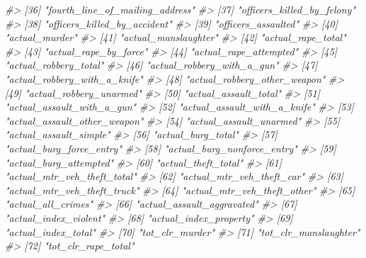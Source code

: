 \documentclass[
  12pt,
  openany]{book}
\newenvironment{Shaded}{\begin{snugshade}}{\end{snugshade}}
\newcommand{\CommentTok}[1]{\textcolor[rgb]{0.37,0.37,0.37}{\textit{#1}}}
\begin{document}
\begin{Shaded}
\begin{Highlighting}[]
\CommentTok{\#\textgreater{}  [36] "fourth\_line\_of\_mailing\_address"}
\CommentTok{\#\textgreater{}  [37] "officers\_killed\_by\_felony"     }
\CommentTok{\#\textgreater{}  [38] "officers\_killed\_by\_accident"   }
\CommentTok{\#\textgreater{}  [39] "officers\_assaulted"            }
\CommentTok{\#\textgreater{}  [40] "actual\_murder"                 }
\CommentTok{\#\textgreater{}  [41] "actual\_manslaughter"           }
\CommentTok{\#\textgreater{}  [42] "actual\_rape\_total"             }
\CommentTok{\#\textgreater{}  [43] "actual\_rape\_by\_force"          }
\CommentTok{\#\textgreater{}  [44] "actual\_rape\_attempted"         }
\CommentTok{\#\textgreater{}  [45] "actual\_robbery\_total"          }
\CommentTok{\#\textgreater{}  [46] "actual\_robbery\_with\_a\_gun"     }
\CommentTok{\#\textgreater{}  [47] "actual\_robbery\_with\_a\_knife"   }
\CommentTok{\#\textgreater{}  [48] "actual\_robbery\_other\_weapon"   }
\CommentTok{\#\textgreater{}  [49] "actual\_robbery\_unarmed"        }
\CommentTok{\#\textgreater{}  [50] "actual\_assault\_total"          }
\CommentTok{\#\textgreater{}  [51] "actual\_assault\_with\_a\_gun"     }
\CommentTok{\#\textgreater{}  [52] "actual\_assault\_with\_a\_knife"   }
\CommentTok{\#\textgreater{}  [53] "actual\_assault\_other\_weapon"   }
\CommentTok{\#\textgreater{}  [54] "actual\_assault\_unarmed"        }
\CommentTok{\#\textgreater{}  [55] "actual\_assault\_simple"         }
\CommentTok{\#\textgreater{}  [56] "actual\_burg\_total"             }
\CommentTok{\#\textgreater{}  [57] "actual\_burg\_force\_entry"       }
\CommentTok{\#\textgreater{}  [58] "actual\_burg\_nonforce\_entry"    }
\CommentTok{\#\textgreater{}  [59] "actual\_burg\_attempted"         }
\CommentTok{\#\textgreater{}  [60] "actual\_theft\_total"            }
\CommentTok{\#\textgreater{}  [61] "actual\_mtr\_veh\_theft\_total"    }
\CommentTok{\#\textgreater{}  [62] "actual\_mtr\_veh\_theft\_car"      }
\CommentTok{\#\textgreater{}  [63] "actual\_mtr\_veh\_theft\_truck"    }
\CommentTok{\#\textgreater{}  [64] "actual\_mtr\_veh\_theft\_other"    }
\CommentTok{\#\textgreater{}  [65] "actual\_all\_crimes"             }
\CommentTok{\#\textgreater{}  [66] "actual\_assault\_aggravated"     }
\CommentTok{\#\textgreater{}  [67] "actual\_index\_violent"          }
\CommentTok{\#\textgreater{}  [68] "actual\_index\_property"         }
\CommentTok{\#\textgreater{}  [69] "actual\_index\_total"            }
\CommentTok{\#\textgreater{}  [70] "tot\_clr\_murder"                }
\CommentTok{\#\textgreater{}  [71] "tot\_clr\_manslaughter"          }
\CommentTok{\#\textgreater{}  [72] "tot\_clr\_rape\_total"            }

\end{Highlighting}
\end{Shaded}
\end{document}
